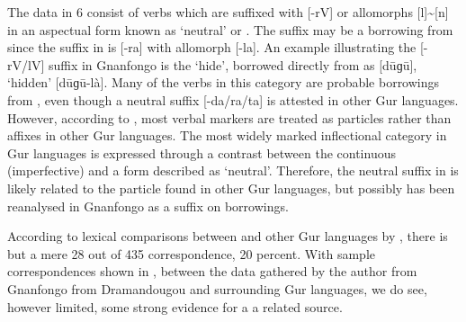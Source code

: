\documentclass[output=paper,
modfonts
]{langscibook}
\begin{document}
The data in 6 consist of verbs which are suffixed with [-rV] or allomorphs [l]{\textasciitilde}[n] in an aspectual form known as ‘neutral’ or . The suffix may be a borrowing from  since the  suffix in  is [-ra] with allomorph [-la]. An example illustrating the [-rV/lV] suffix in Gnanfongo  is the  ‘hide’, borrowed directly from  as [dūɡū], ‘hidden’ [dūɡū-là]. Many of the verbs in this category are probable borrowings from , even though a neutral suffix [-da/ra/ta] is attested in other Gur languages. However, according to \citet{Naden1989}, most verbal markers are treated as particles rather than affixes in other Gur languages. The most widely marked inflectional category in Gur languages is expressed through a contrast between the continuous (imperfective) and a form described as ‘neutral’. Therefore, the neutral suffix in  is likely related to the particle found in other Gur languages, but possibly has been reanalysed in Gnanfongo  as a  suffix on  borrowings.

According to lexical comparisons between  and other Gur languages by \citet{Manessy1982}, there is but a mere 28 out of 435 correspondence, 20 percent. With sample correspondences shown in , between the data gathered by the author from Gnanfongo  from Dramandougou and surrounding Gur languages, we do see, however limited, some strong evidence for a a related source.
\end{document}
